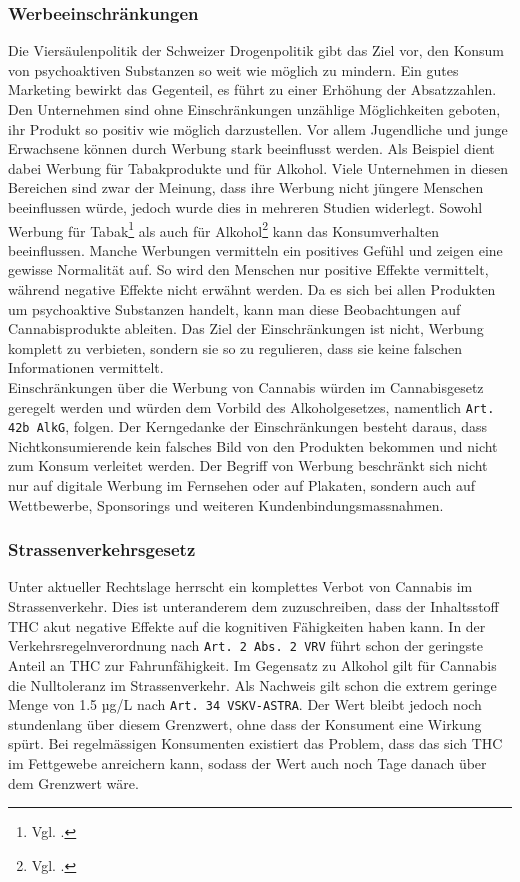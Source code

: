 \documentclass[../main.tex]{subfiles}
\begin{document}
	 \subsubsection{Werbeeinschränkungen}
	 Die Viersäulenpolitik der Schweizer Drogenpolitik gibt das Ziel vor, den Konsum von psychoaktiven Substanzen so weit wie möglich zu mindern.
	 Ein gutes Marketing bewirkt das Gegenteil, es führt zu einer Erhöhung der Absatzzahlen.
	 Den Unternehmen sind ohne Einschränkungen unzählige Möglichkeiten geboten, ihr Produkt so positiv wie möglich darzustellen.	 
	 Vor allem Jugendliche und junge Erwachsene können durch Werbung stark beeinflusst werden.
	 Als Beispiel dient dabei Werbung für Tabakprodukte und für Alkohol.
	 Viele Unternehmen in diesen Bereichen sind zwar der Meinung, dass ihre Werbung nicht jüngere Menschen beeinflussen würde, jedoch wurde dies in mehreren Studien widerlegt.
	 Sowohl Werbung für Tabak\footnote{Vgl. \cite{lovato}.} als auch für Alkohol\footnote{Vgl. \cite{jernigan}.} kann das Konsumverhalten beeinflussen.
	 Manche Werbungen vermitteln ein positives Gefühl und zeigen eine gewisse Normalität auf. 
	 So wird den Menschen nur positive Effekte vermittelt, während negative Effekte nicht erwähnt werden.
	 Da es sich bei allen Produkten um psychoaktive Substanzen handelt, kann man diese Beobachtungen auf Cannabisprodukte ableiten.
	 Das Ziel der Einschränkungen ist nicht, Werbung komplett zu verbieten, sondern sie so zu regulieren, dass sie keine falschen Informationen vermittelt.\\
	 
	 \noindent	 
	 Einschränkungen über die Werbung von Cannabis würden im Cannabisgesetz geregelt werden und würden dem Vorbild des Alkoholgesetzes, namentlich \texttt{Art. 42b AlkG}, folgen.
	 Der Kerngedanke der Einschränkungen besteht daraus, dass Nichtkonsumierende kein falsches Bild von den Produkten bekommen und nicht zum Konsum verleitet werden.
	 Der Begriff von Werbung beschränkt sich nicht nur auf digitale Werbung im Fernsehen oder auf Plakaten, sondern auch auf Wettbewerbe, Sponsorings und weiteren Kundenbindungsmassnahmen.
	 
	 	 
	 \subsubsection{Strassenverkehrsgesetz}
	 Unter aktueller Rechtslage herrscht ein komplettes Verbot von Cannabis im Strassenverkehr. 
	 Dies ist unteranderem dem zuzuschreiben, dass der Inhaltsstoff THC akut negative Effekte auf die kognitiven Fähigkeiten haben kann.	 
	 In der Verkehrsregelnverordnung nach \texttt{Art. 2 Abs. 2 VRV} führt schon der geringste Anteil an THC zur Fahrunfähigkeit.
	 Im Gegensatz zu Alkohol gilt für Cannabis die Nulltoleranz im Strassenverkehr.
	 Als Nachweis gilt schon die extrem geringe Menge von 1.5 µg/L nach \texttt{Art. 34 VSKV-ASTRA}.
	 Der Wert bleibt jedoch noch stundenlang über diesem Grenzwert, ohne dass der Konsument eine Wirkung spürt.
	 Bei regelmässigen Konsumenten existiert das Problem, dass das sich THC im Fettgewebe anreichern kann, sodass der Wert auch noch Tage danach über dem Grenzwert wäre. \\
	 
\end{document}
